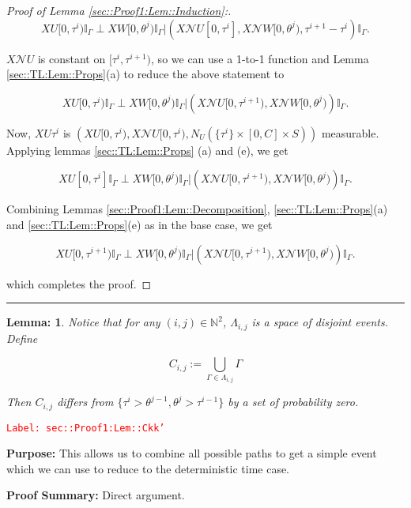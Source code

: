 \documentclass[12pt]{article}
\newcommand{\mb}{\mathbb}
\newcommand{\mc}{\mathcal}
\newcommand{\tr}{\textcolor{red}}
\newcommand{\labe}[1]{\tr{\texttt{Label: #1}}}
\newcommand{\purpose}{\textbf{Purpose: }}
\newcommand{\pfsum}{\textbf{Proof Summary: }}
\newcommand{\lin}{\rule{\linewidth}{0.4 pt}}
\renewcommand{\U}{U}							%
\newcommand{\UU}{W}								%
\renewcommand{\S}{S}							%
\newcommand{\X}{X}								%
\newcommand{\neigh}{\mc{N}}						%
\newcommand{\const}{C}							%
\newcommand{\poiss}[1]{N_{#1}}						%
\newcommand{\rt}[1]{\tau^{#1}}						%
\newcommand{\rtt}[1]{\theta^{#1}}					%
\newcommand{\itt}{i}								%
\newcommand{\ittt}{j}								%
\newcommand{\apath}{\Gamma}						%
\newcommand{\pathset}[2]{\Lambda_{#1,#2}}			%
\newcommand{\pathsete}[2]{C_{#1,#2}}			%
\newtheorem{lem}[thms]{Lemma: }
\begin{document}
\begin{proof}[Proof of Lemma \ref{sec::Proof1:Lem::Induction}:]
\[\X{\U}{[0,\rt{\itt})}\mb{I}_{\apath}\perp \X{\UU}{[0,\rtt{\ittt})}\mb{I}_{\apath}|\left(\X{\neigh{\U}}{[0,\rt{\itt}]},\X{\neigh{\UU}}{[0,\rtt{\ittt})},\rt{\itt+1} - \rt{\itt}\right)\mb{I}_{\apath}.\]

\(\X{\neigh{\U}}{}\) is constant on \([\rt{\itt},\rt{\itt+1})\), so we can use a 1-to-1 function and Lemma \ref{sec::TL:Lem::Props}(a) to reduce the above statement to

\[\X{\U}{[0,\rt{\itt})}\mb{I}_{\apath}\perp \X{\UU}{[0,\rtt{\ittt})}\mb{I}_{\apath}|\left(\X{\neigh{\U}}{[0,\rt{\itt+1})},\X{\neigh{\UU}}{[0,\rtt{\ittt})}\right)\mb{I}_{\apath}.\]

Now, \(\X{\U}{\rt{\itt}}\) is \(\left(\X{\U}{[0,\rt{\itt})}, \X{\neigh{\U}}{[0,\rt{\itt})}, \poiss{\U}(\{\rt{\itt}\}\times [0,\const{}]\times\S)\right)\) measurable. Applying lemmas \ref{sec::TL:Lem::Props} (a) and (e), we get

\[\X{\U}{[0,\rt{\itt}]}\mb{I}_{\apath}\perp \X{\UU}{[0,\rtt{\ittt})}\mb{I}_{\apath}|\left(\X{\neigh{\U}}{[0,\rt{\itt+1})},\X{\neigh{\UU}}{[0,\rtt{\ittt})}\right)\mb{I}_{\apath}.\]

Combining Lemmas \ref{sec::Proof1:Lem::Decomposition}, \ref{sec::TL:Lem::Props}(a) and \ref{sec::TL:Lem::Props}(e) as in the base case, we get

\[\X{\U}{[0,\rt{\itt+1})}\mb{I}_{\apath}\perp \X{\UU}{[0,\rtt{\ittt})}\mb{I}_{\apath}|\left(\X{\neigh{\U}}{[0,\rt{\itt+1})},\X{\neigh{\UU}}{[0,\rtt{\ittt})}\right)\mb{I}_{\apath}.\]

which completes the proof.
\end{proof}

\lin

\begin{lem}
Notice that for any \((\itt,\ittt) \in \mb{N}^2\), \(\pathset{\itt}{\ittt}\) is a space of disjoint events. Define

\[\pathsete{\itt}{\ittt} := \bigcup_{\apath\in\pathset{\itt}{\ittt}} \apath\]

Then \(\pathsete{\itt}{\ittt}\) differs from \(\{\rt{\itt} > \rtt{\ittt-1}, \rtt{\ittt} > \rt{\itt-1}\}\) by a set of probability zero.
\label{sec::Proof1:Lem::Ckk'}
\end{lem}
\labe{sec::Proof1:Lem::Ckk'}

\purpose This allows us to combine all possible paths to get a simple event which we can use to reduce to the deterministic time case.

\pfsum Direct argument.
\end{document}
